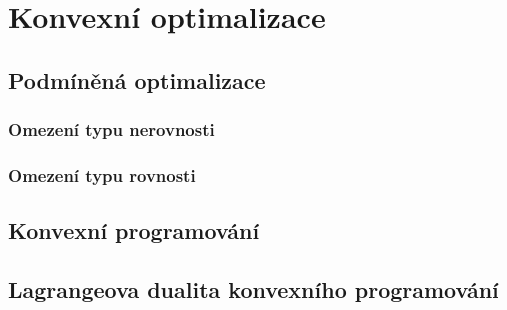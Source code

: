\chapter{Konvexní optimalizace}

\section{Podmíněná optimalizace}

\subsection{Omezení typu nerovnosti}

\subsection{Omezení typu rovnosti}

\section{Konvexní programování}

\section{Lagrangeova dualita konvexního programování}
